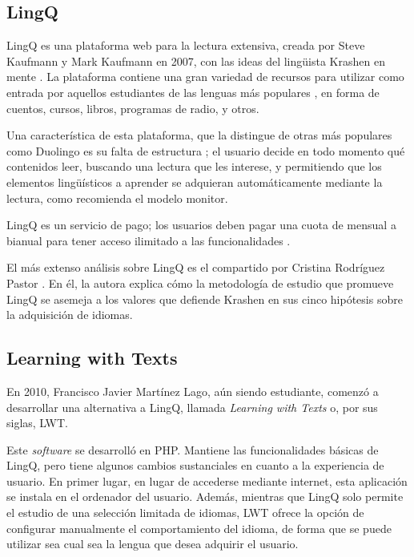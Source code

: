 \subsection{LingQ}

LingQ es una plataforma web para la lectura extensiva, creada por Steve Kaufmann y Mark Kaufmann en 2007, con las ideas del lingüista Krashen en mente \autocite{LingQ}. La plataforma contiene una gran variedad de recursos para utilizar como entrada por aquellos estudiantes de las lenguas más populares \autocite{clara2025}, en forma de cuentos, cursos, libros, programas de radio, y otros.


Una característica de esta plataforma, que la distingue de otras más populares como Duolingo es su falta de estructura \autocite{Karasimos}; el usuario decide en todo momento qué contenidos leer, buscando una lectura que les interese, y permitiendo que los elementos lingüísticos a aprender se adquieran automáticamente mediante la lectura, como recomienda el modelo monitor.

LingQ es un servicio de pago; los usuarios deben pagar una cuota de mensual a bianual para tener acceso ilimitado a las funcionalidades \autocite{kabbasovna}.

El más extenso análisis sobre LingQ es el compartido por Cristina Rodríguez Pastor \autocite{Pastor_2022}. En él, la autora explica cómo la metodología de estudio que promueve LingQ se asemeja a los valores que defiende Krashen en sus cinco hipótesis sobre la adquisición de idiomas.

\subsection{Learning with Texts}

En 2010, Francisco Javier Martínez Lago, aún siendo estudiante, comenzó a desarrollar una alternativa a LingQ, llamada \textit{Learning with Texts} o, por sus siglas, LWT. \autocite{LWT}

Este \textit{software} se desarrolló en PHP. Mantiene las funcionalidades básicas de LingQ, pero tiene algunos cambios sustanciales en cuanto a la experiencia de usuario. En primer lugar, en lugar de accederse mediante internet, esta aplicación se instala en el ordenador del usuario. Además, mientras que LingQ solo permite el estudio de una selección limitada de idiomas, LWT ofrece la opción de configurar manualmente el comportamiento del idioma, de forma que se puede utilizar sea cual sea la lengua que desea adquirir el usuario.

